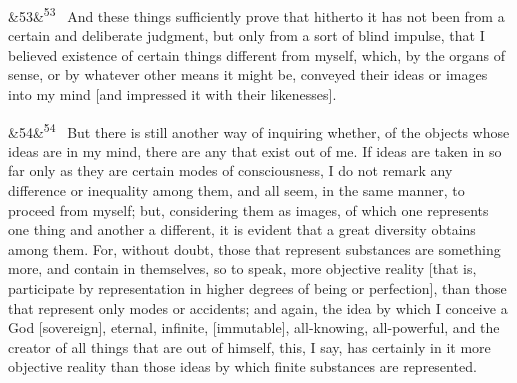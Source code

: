 \documentclass[12pt]{article}
\newcommand{\para}[1][]{\par\noindent\ifx&#1&\else\textsuperscript{\footnotesize #1}~\fi}
\begin{document}
\para[53] And these things sufficiently prove that hitherto it has not been from a certain and deliberate judgment, but only from a sort of blind impulse, that I believed existence of certain things different from myself, which, by the organs of sense, or by whatever other means it might be, conveyed their ideas or images into my mind [and impressed it with their likenesses].

\para[54] But there is still another way of inquiring whether, of the objects whose ideas are in my mind, there are any that exist out of me. If ideas are taken in so far only as they are certain modes of consciousness, I do not remark any difference or inequality among them, and all seem, in the same manner, to proceed from myself; but, considering them as images, of which one represents one thing and another a different, it is evident that a great diversity obtains among them. For, without doubt, those that represent substances are something more, and contain in themselves, so to speak, more objective reality [that is, participate by representation in higher degrees of being or perfection], than those that represent only modes or accidents; and again, the idea by which I conceive a God [sovereign], eternal, infinite, [immutable], all-knowing, all-powerful, and the creator of all things that are out of himself, this, I say, has certainly in it more objective reality than those ideas by which finite substances are represented.
\end{document}
